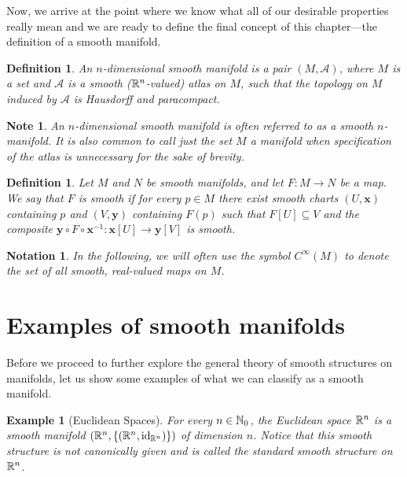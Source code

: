 \documentclass[11pt,a4paper,twoside,openany]{report}
\theoremstyle{my-theorem}
\theoremstyle{non-theorem}
\newtheorem{definition}[theorem]{Definition}
\newtheorem{example}[theorem]{Example}
\newtheorem{notation}[theorem]{Notation}
\newtheorem{note}[theorem]{Note}
\begin{document}
		Now, we arrive at the point where we know what all of our desirable properties really mean and we are ready to define the final concept of this chapter---the definition of a smooth manifold.
		\begin{definition}
			An \emph{$n$-dimensional smooth manifold} is a pair $(M, \mathcal A)$, where $M$ is a set and $\mathcal A$ is a smooth (${\mathbb R}^n$-valued) atlas on $M$, such that the topology on $M$ induced by $\mathcal A$ is Hausdorff and paracompact.
		\end{definition}
	
		\begin{note}
			An $n$-dimensional smooth manifold is often referred to as a smooth $n$-manifold. It is also common to call just the set $M$ a manifold when specification of the atlas is unnecessary for the sake of brevity.
		\end{note}
		
		\begin{definition}
			Let $M$ and $N$ be smooth manifolds, and let $F: M \to N$ be a map. We say that $F$ is 
			\emph{smooth} if for every $p \in M$ there exist smooth charts $(U,\mathbf x)$ containing $p$ and $(V,\mathbf y)$ containing $F(p)$ such that $F[U] \subseteq V$ and the composite $\mathbf y \circ F \circ \mathbf x^{-1}: \mathbf x[U] \to \mathbf y[V]$ is smooth.
		\end{definition}
	
		\begin{notation}
			In the following, we will often use the symbol $C^\infty(M)$ to denote the set of all smooth, real-valued maps on $M$.
		\end{notation}
	
	\section{Examples of smooth manifolds}
	
		Before we proceed to further explore the general theory of smooth structures on manifolds, let us show some examples of what we can classify as a smooth manifold.
		\begin{example}[Euclidean Spaces]
			For every $n \in {\mathbb N}_0$, the Euclidean space ${\mathbb R}^n$ is a smooth manifold $({\mathbb R}^n,\{({\mathbb R}^n,\operatorname{id}_{{\mathbb R}^n})\})$ of dimension $n$. Notice that this smooth structure is not canonically given and is called the \emph{standard smooth structure on} ${\mathbb R}^n$.
		\end{example}
	
\end{document}
